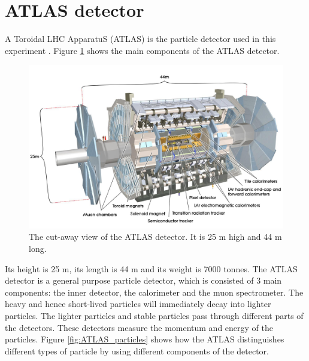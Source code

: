 \section{ATLAS detector}
\label{sec:detector_ATLAS}

A Toroidal LHC ApparatuS (ATLAS) is the particle detector used in this experiment \cite{ATLAS_doc}.
Figure \ref{fig:detector_ATLAS} shows the main components of the ATLAS detector.
\begin{figure}
\centering
\includegraphics[width=\textwidth]{data/photo/detector/ATLAS.jpg}
\caption{The cut-away view of the ATLAS detector. It is 25 m high and 44 m long. \cite{ATLAS_photo}}
\label{fig:detector_ATLAS}
\end{figure}
Its height is 25 m, its length is 44 m and its weight is 7000 tonnes.
The ATLAS detector is a general purpose particle detector, which is consisted of 3 main components: the inner detector, the calorimeter and the muon spectrometer.
The heavy and hence short-lived particles will immediately decay into lighter particles.
The lighter particles and stable particles pass through different parts of the detectors.
These detectors measure the momentum and energy of the particles.
Figure \ref{fig:ATLAS_particles} shows how the ATLAS distinguishes different types of particle by using different components of the detector.
